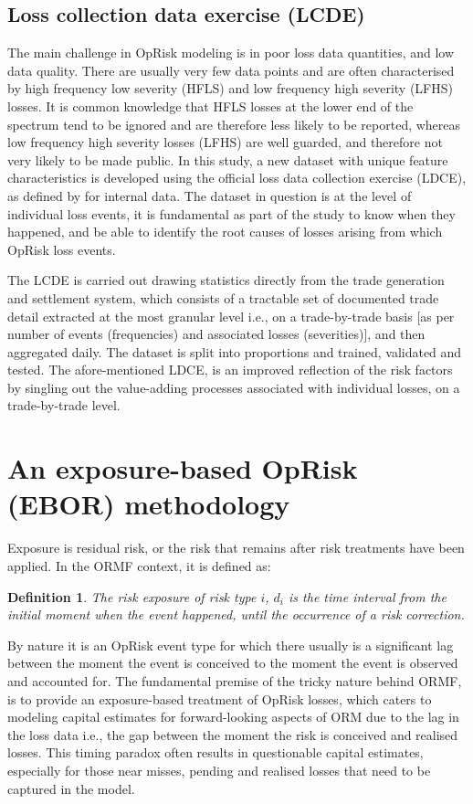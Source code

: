 \documentclass[a4paper]{article}
\newtheorem{definition}{Definition}[subsection]
\begin{document}
\subsection{Loss collection data exercise (LCDE)}

The main challenge in OpRisk modeling is in poor loss data quantities, and low data quality. There are usually very few data points and are often characterised by high frequency low severity (HFLS) and low frequency high severity (LFHS) losses. It is common knowledge that HFLS losses at the lower end of the spectrum tend to be ignored and are therefore less likely to be reported, whereas low frequency high severity losses (LFHS) are well guarded, and therefore not very likely to be made public. In this study, a new dataset with unique feature characteristics is developed using the official loss data collection exercise (LDCE), as defined by \cite{basel2011operational} for internal data. The dataset in question is at the level of individual loss events, it is fundamental as part of the study to know when they happened, and be able to identify the root causes of losses arising from which OpRisk loss events.\medskip

The LCDE is carried out drawing statistics directly from the trade generation and settlement system, which consists of a tractable set of documented trade detail extracted at the most granular level i.e., on a trade-by-trade basis [as per number of events (frequencies) and associated losses (severities)], and then aggregated daily. The dataset is split into proportions and trained, validated and tested. The afore-mentioned LDCE, is an improved reflection of the risk factors by singling out the value-adding processes associated with individual losses, on a trade-by-trade level.\medskip

\section{An exposure-based OpRisk (EBOR) methodology}

Exposure is residual risk, or the risk that remains after risk treatments have been applied. In the ORMF context, it is defined as:
\begin{definition}
The risk exposure of risk type $i$, $d_i$ is the time interval from the initial moment when the event happened, until the occurrence of a risk correction.  
\end{definition}
By nature it is an OpRisk event type for which there usually is a significant lag between the moment the event is conceived to the moment the event is observed and accounted for. The fundamental premise of the tricky nature behind ORMF, is to provide an exposure-based treatment of OpRisk losses, which caters to modeling capital estimates for forward-looking aspects of ORM due to the lag in the loss data i.e., the gap between the moment the risk is conceived and realised losses. This timing paradox often results in questionable capital estimates, especially for those near misses, pending and realised losses that need to be captured in the model.\medskip
\end{document}

